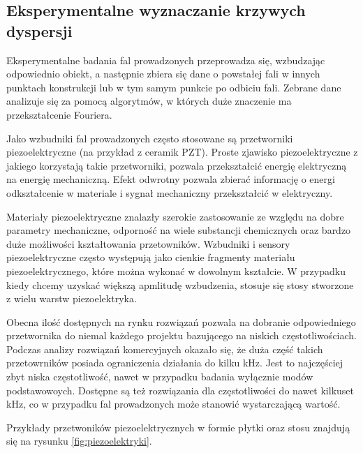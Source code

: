 \subsection{Eksperymentalne wyznaczanie krzywych dyspersji}

Eksperymentalne badania fal prowadzonych przeprowadza się, wzbudzając odpowiednio obiekt, a następnie zbiera się dane o powstałej fali w innych punktach konstrukcji lub w tym samym punkcie po odbiciu fali. Zebrane dane analizuje się za pomocą algorytmów, w których duże znaczenie ma przekształcenie Fouriera.

Jako wzbudniki fal prowadzonych często stosowane są przetworniki piezoelektryczne (na przykład z ceramik PZT). Proste zjawisko piezoelektryczne z jakiego korzystają takie przetworniki, pozwala przekształcić energię elektryczną na energię mechaniczną. Efekt odwrotny pozwala zbierać informację o energi odkształcenie w materiale i sygnał mechaniczny przekształcić w elektryczny. 

Materiały piezoelektryczne znalazły szerokie zastosowanie ze względu na dobre parametry mechaniczne, odporność na wiele substancji chemicznych oraz bardzo duże możliwości kształtowania przetowników. Wzbudniki i sensory piezoelektryczne często występują jako cienkie fragmenty materiału piezoelektrycznego, które można wykonać w dowolnym kształcie. W przypadku kiedy chcemy uzyskać większą apmlitudę wzbudzenia, stosuje się stosy stworzone z wielu warstw piezoelektryka.

Obecna ilość dostępnych na rynku rozwiązań pozwala na dobranie odpowiedniego przetwornika do niemal każdego projektu bazującego na niskich częstotliwościach. Podczas analizy rozwiązań komercyjnych okazało się, że duża część takich przetowrników posiada ograniczenia działania do kilku kHz. Jest to najczęściej zbyt niska częstotliwość, nawet w przypadku badania wyłącznie modów podstawowoych. Dostępne są też rozwiązania dla częstotliwości do nawet kilkuset kHz, co w przypadku fal prowadzonych może stanowić wystarczającą wartość.

Przykłady przetwoników piezoelektrycznych w formie płytki oraz stosu znajdują się na rysunku \ref{fig:piezoelektryki}.

